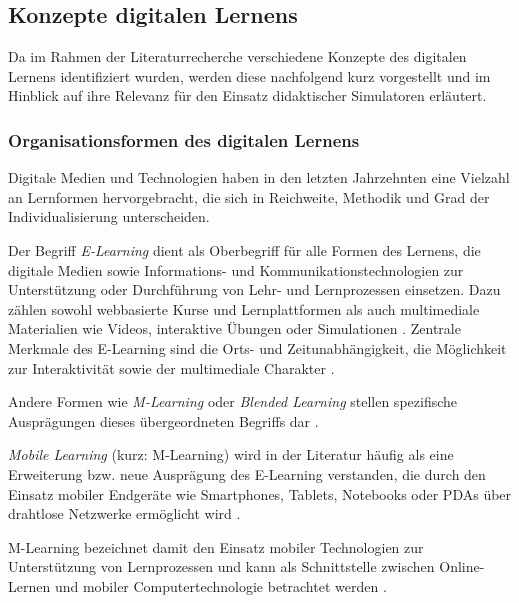\subsection{Konzepte digitalen Lernens}

Da im Rahmen der Literaturrecherche verschiedene Konzepte des digitalen Lernens identifiziert wurden, werden diese nachfolgend kurz vorgestellt und im Hinblick auf ihre Relevanz für den Einsatz didaktischer Simulatoren erläutert.

\subsubsection{Organisationsformen des digitalen Lernens}

Digitale Medien und Technologien haben in den letzten Jahrzehnten eine Vielzahl an Lernformen hervorgebracht, die sich in Reichweite, Methodik und Grad der Individualisierung unterscheiden.

Der Begriff \textit{E-Learning} dient als Oberbegriff für alle Formen des Lernens, die digitale Medien sowie Informations- und Kommunikationstechnologien zur Unterstützung oder Durchführung von Lehr- und Lernprozessen einsetzen. Dazu zählen sowohl webbasierte Kurse und Lernplattformen als auch multimediale Materialien wie Videos, interaktive Übungen oder Simulationen \parencite[S.~6]{kerres_mediendidaktik_2018}. Zentrale Merkmale des E-Learning sind die Orts- und Zeitunabhängigkeit, die Möglichkeit zur Interaktivität sowie der multimediale Charakter \parencite[S.~186f]{sanderson_e-learning_2002}. 

Andere Formen wie \textit{M-Learning} oder \textit{Blended Learning} stellen spezifische Ausprägungen dieses übergeordneten Begriffs dar \parencites[S.~74]{magenheim_blended_2003}[S.~3]{balaji_perspective_2016}.

\textit{Mobile Learning} (kurz: M-Learning) wird in der Literatur häufig als eine Erweiterung bzw. neue Ausprägung des E-Learning verstanden, die durch den Einsatz mobiler Endgeräte wie Smartphones, Tablets, Notebooks oder PDAs über drahtlose Netzwerke ermöglicht wird \parencites[S.~3f]{balaji_perspective_2016}[S.~197]{basak_kumar_e-learning_2018}. 

M-Learning bezeichnet damit den Einsatz mobiler Technologien zur Unterstützung von Lernprozessen und kann als Schnittstelle zwischen Online-Lernen und mobiler Computertechnologie betrachtet werden \parencite[S.~265]{traxler_defining_2005}.

